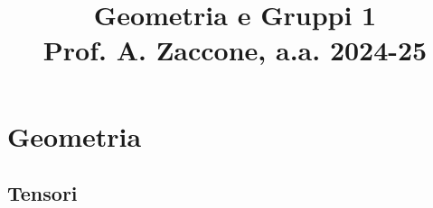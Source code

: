 \documentclass[a4paper, 12pt, openany]{book}
\title{\Huge\textbf{Geometria e Gruppi 1} \\ \large Prof. A. Zaccone, a.a. 2024-25}
\begin{document}
\frontmatter

\maketitle
\tableofcontents

\mainmatter

\part{Geometria}

\chapter{Tensori}

\end{document}
